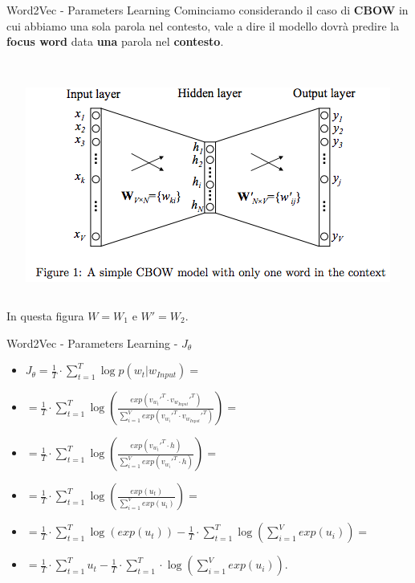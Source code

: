 \documentclass[british]{beamer}
\begin{document}
\begin{frame}{Word2Vec - Parameters Learning}
	Cominciamo considerando il caso di \textbf{CBOW} in cui abbiamo una sola parola nel contesto, vale a dire il modello dovr\`{a} predire la \textbf{focus word} data \textbf{\alert{una}} parola nel \textbf{contesto}.
	\\~\\
	\begin{columns}
		\begin{column}{0.15\textwidth}
		
		\end{column}
		\begin{column}{0.7\textwidth}
			\includegraphics[width=1\linewidth,height=0.55\textwidth]{./Imgs/cbow_onecontext}
		\end{column}
		\begin{column}{0.15\textwidth}
		
		\end{column}
	\end{columns}
	In questa figura \(W = W_1\) e \(W' = W_2\).
\end{frame}

\begin{frame}{Word2Vec - Parameters Learning - \(J_{\theta}\)}
	\begin{itemize}
		\item \(J_{\theta} = \frac{1}{T} \cdot \sum_{t=1}^{T} \log p(w_{t}|w_{Input}) = \)
		\item \(= \frac{1}{T} \cdot \sum_{t=1}^{T} \log \left( \frac{exp(v_{w_{t}}'^T \cdot v_{w_{Input}}'^T)}{\sum_{i=1}^{V} exp(v_{w_{i}}'^T \cdot v_{w_{Input}}'^T)} \right) =\) 
		\item \(= \frac{1}{T} \cdot \sum_{t=1}^{T} \log \left( \frac{exp(v_{w_{t}}'^T \cdot h)}{\sum_{i=1}^{V} exp(v_{w_{i}}'^T \cdot h)} \right) = \)
		\item \(= \frac{1}{T} \cdot \sum_{t=1}^{T} \log \left( \frac{exp(u_t)}{\sum_{i=1}^{V} exp(u_i)} \right) = \)
		\item \(= \frac{1}{T} \cdot \sum_{t=1}^{T} \log \left( exp(u_t) \right) - \frac{1}{T} \cdot \sum_{t=1}^{T} \log \left( \sum_{i=1}^{V} exp(u_i) \right) = \)
		\item \(= \frac{1}{T} \cdot \sum_{t=1}^{T} u_t - \frac{1}{T} \cdot \sum_{t=1}^{T} \cdot \log \left( \sum_{i=1}^{V} exp(u_i) \right). \)
	\end{itemize}
\end{frame}
\end{document}
